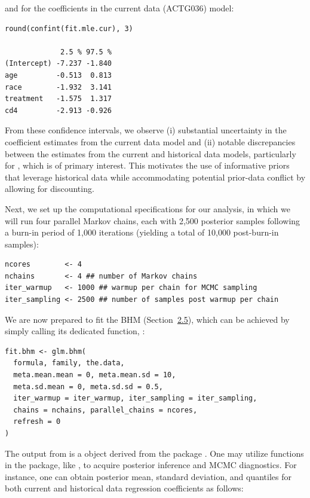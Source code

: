 and for the coefficients in the current data (ACTG036) model:
\begin{verbatim}
round(confint(fit.mle.cur), 3)

             2.5 % 97.5 %
(Intercept) -7.237 -1.840
age         -0.513  0.813
race        -1.932  3.141
treatment   -1.575  1.317
cd4         -2.913 -0.926
\end{verbatim}
From these confidence intervals, we observe (i) substantial uncertainty in the coefficient estimates from the current data model and (ii) notable discrepancies between the estimates from the current and historical data models, particularly for , which is of primary interest. This motivates the use of informative priors that leverage historical data while accommodating potential prior-data conflict by allowing for discounting.

Next, we set up the computational specifications for our analysis, in which we will run four parallel Markov chains, each with {2,500} posterior samples following a burn-in period of {1,000} iterations (yielding a total of {10,000} post-burn-in samples):

\begin{verbatim}
ncores        <- 4
nchains       <- 4 ## number of Markov chains
iter_warmup   <- 1000 ## warmup per chain for MCMC sampling
iter_sampling <- 2500 ## number of samples post warmup per chain
\end{verbatim}
We are now prepared to fit the BHM (Section~\hyperref[sec:bhm]{2.5}), which can be achieved by simply calling its dedicated function, :

\begin{verbatim}
fit.bhm <- glm.bhm(
  formula, family, the.data,
  meta.mean.mean = 0, meta.mean.sd = 10,
  meta.sd.mean = 0, meta.sd.sd = 0.5,
  iter_warmup = iter_warmup, iter_sampling = iter_sampling,
  chains = nchains, parallel_chains = ncores,
  refresh = 0
)
\end{verbatim}
The output from  is a  object derived from the  package \citep{posterior_pkg}. One may utilize functions in the  package, like , to acquire posterior inference and MCMC diagnostics. For instance, one can obtain posterior mean, standard deviation, and quantiles for both current and historical data regression coefficients as follows:

